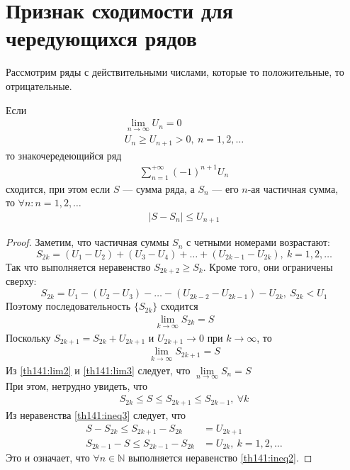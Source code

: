\section{Признак сходимости для чередующихся рядов}
Рассмотрим ряды с действительными числами, которые то положительные, то
отрицательные.

\begin{theorem}[Лейбница]
  Если
  \begin{gather}
    \lim\limits_{n \to \infty} U_n = 0 \label{th141:lim1} \\
    U_n \geq U_{n+1} > 0, \ n = 1, 2, \dots \label{th141:ineq1}
  \end{gather}
  то знакочередеющийся ряд
  \begin{gather}
    \sum\limits_{n = 1}^{+\infty} {(-1)}^{n+1} U_n \label{th141:sum1}
  \end{gather}
  сходится, при этом если $S$ --- сумма ряда, а $S_n$ --- его $n$-ая частичная
  сумма,\\ то $\forall n: n = 1, 2, \dots$
  \begin{gather}
    |S - S_n| \leq U_{n+1} \label{th141:ineq2}
  \end{gather}
\end{theorem}

\begin{proof}
  Заметим, что частичная суммы $S_n$ с четными номерами возрастают:
  $$S_{2k} = (U_1 - U_2) + (U_3 - U_4) + \dots + (U_{2k - 1} - U_{2k}), \
  k = 1, 2, \dots $$
  Так что выполняется неравенство $S_{2k + 2} \geq S_k$. Кроме того, они
  ограничены сверху:
  $$S_{2k} = U_1 - (U_2 - U_3) - \dots - (U_{2k - 2} - U_{2k - 1}) - U_{2k}, \
  S_{2k} < U_1$$
  Поэтому последовательность $\{S_{2k}\}$ сходится
  \begin{gather}
    \lim\limits_{k \to \infty} S_{2k} = S \label{th141:lim2}
  \end{gather}
  Поскольку $S_{2k + 1} = S_{2k} + U_{2k + 1}$ и $U_{2k + 1} \to 0$ при
  $k \to \infty$, то
  \begin{gather}
    \lim\limits_{k \to \infty} S_{2k + 1} = S \label{th141:lim3}
  \end{gather}
  Из \eqref{th141:lim2} и \eqref{th141:lim3} следует, что
  $\lim\limits_{n \to \infty} S_n = S$ \\
  При этом, нетрудно увидеть, что
  \begin{gather}
    S_{2k} \leq S \leq S_{2k + 1} \leq S_{2k - 1}, \ \forall k \label{th141:ineq3}
  \end{gather}
  Из неравенства \eqref{th141:ineq3} следует, что
  \begin{align*}
    S - S_{2k} \leq S_{2k + 1} - S_{2k} &= U_{2k + 1} \\
    S_{2k - 1} - S \leq S_{2k - 1} - S_{2k} &= U_{2k}, \ k = 1, 2, \dots
  \end{align*}
  Это и означает, что $\forall n \in \mathbb{N}$ выполняется
  неравенство \eqref{th141:ineq2}.
\end{proof}

